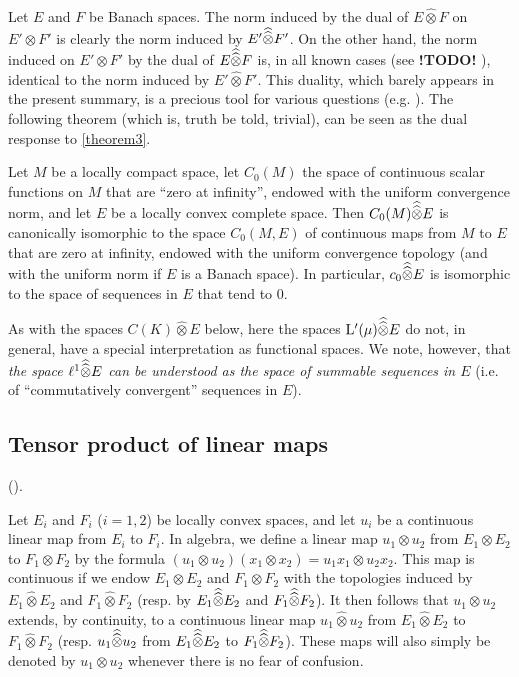 \documentclass{article}
\theoremstyle{plain}
\newenvironment{theorem}[1]
    {\renewcommand\theinnercustomtheorem{#1}\innercustomtheorem}
    {\endinnercustomtheorem}
\newcommand{\LL}{\mathrm{L}}
\renewcommand{\ll}{\ell}
\newcommand{\hotimes}{\widehat{\otimes}}
\newcommand{\hhotimes}{\skew{0}{\widehat}{\skew{0}\widehat{\otimes}}}
\newcommand{\todo}{\textbf{ !TODO! }}
\newcommand{\oldpage}[1]{\marginpar{\footnotesize$\Big\vert$ \textit{p.~#1}}}
\begin{document}
Let $E$ and $F$ be Banach spaces.
The norm induced by the dual of $E\hotimes F$ on $E'\otimes F'$ is clearly the norm induced by $E'\hhotimes F'$.
On the other hand, the norm induced on $E'\otimes F'$ by the dual of $E\hhotimes F$ is, in all known cases (see \todo), identical to the norm induced by $E'\hotimes F'$.
This duality, which barely appears in the present summary, is a precious tool for various questions
\oldpage{83}
(e.g. \cite[chap.~I, \S4, n\textsuperscript{o}~6]{PTT}).
The following theorem (which is, truth be told, trivial), can be seen as the dual response to \cref{theorem3}.

\begin{theorem}{4}
\label{theorem4}
  Let $M$ be a locally compact space, let $C_0(M)$ the space of continuous scalar functions on $M$ that are ``zero at infinity'', endowed with the uniform convergence norm, and let $E$ be a locally convex complete space.
  Then $C_0(M)\hhotimes E$ is canonically isomorphic to the space $C_0(M,E)$ of continuous maps from $M$ to $E$ that are zero at infinity, endowed with the uniform convergence topology (and with the uniform norm if $E$ is a Banach space).
  In particular, $c_0\hhotimes E$ is isomorphic to the space of sequences in $E$ that tend to $0$.
\end{theorem}

As with the spaces $C(K)\hotimes E$ below, here the spaces $\LL'(\mu)\hhotimes E$ do not, in general, have a special interpretation as functional spaces.
We note, however, that \emph{the space $\ll^1\hhotimes E$ can be understood as the space of summable sequences in $E$} (i.e. of ``commutatively convergent'' sequences in $E$).


\subsection{Tensor product of linear maps}
\label{subsection:tensor-product-of-linear-maps}

(\cite[chap.~1, \S1, n\textsuperscript{o}~2]{PTT}).
\medskip

Let $E_i$ and $F_i$ ($i=1,2$) be locally convex spaces, and let $u_i$ be a continuous linear map from $E_i$ to $F_i$.
In algebra, we define a linear map $u_1\otimes u_2$ from $E_1\otimes E_2$ to $F_1\otimes F_2$ by the formula $(u_1\otimes u_2)(x_1\otimes x_2)=u_1x_1\otimes u_2x_2$.
This map is continuous if we endow $E_1\otimes E_2$ and $F_1\otimes F_2$ with the topologies induced by $E_1\hotimes E_2$ and $F_1\hotimes F_2$ (resp. by $E_1\hhotimes E_2$ and $F_1\hhotimes F_2$).
It then follows that $u_1\otimes u_2$ extends, by continuity, to a continuous linear map $u_1\hotimes u_2$ from $E_1\hotimes E_2$ to $F_1\hotimes F_2$ (resp. $u_1\hhotimes u_2$ from $E_1\hhotimes E_2$ to $F_1\hhotimes F_2$).
These maps will also simply be denoted by $u_1\otimes u_2$ whenever there is no fear of confusion.
\end{document}

